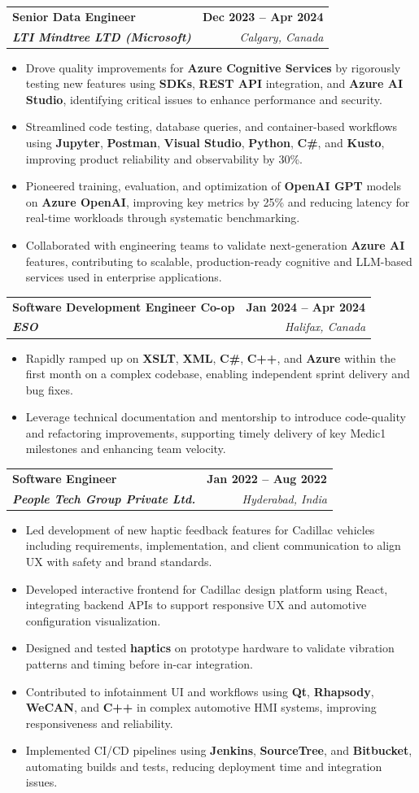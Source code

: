 \documentclass[letterpaper,11pt]{article}
\makeatletter
\newcommand{\resumeItem}[1]{
  \item\small{
    {#1 \vspace{-2pt}}
  }
}
\newcommand{\resumeSubheading}[4]{
  \vspace{-2pt}\item
    \begin{tabular*}{1.0\textwidth}[t]{l@{\extracolsep{\fill}}r}
      \textbf{#1} & \textbf{\small #2} \\
      \textit{\small#3} & \textit{\small #4} \\
    \end{tabular*}\vspace{-7pt}
}
\newcommand{\resumeItemListStart}{\begin{itemize}}
\newcommand{\resumeItemListEnd}{\end{itemize}\vspace{-5pt}}
\makeatother
\begin{document}
    \resumeSubheading
      {\textbf{Senior Data Engineer}}{\textbf{Dec 2023 -- Apr 2024}}
      {\textbf{LTI Mindtree LTD (Microsoft)}}{Calgary, Canada}
      \resumeItemListStart
        \resumeItem{Drove quality improvements for \textbf{Azure Cognitive Services} by rigorously testing new features using \textbf{SDKs}, \textbf{REST API} integration, and \textbf{Azure AI Studio}, identifying critical issues to enhance performance and security.}
        \resumeItem{Streamlined code testing, database queries, and container-based workflows using \textbf{Jupyter}, \textbf{Postman}, \textbf{Visual Studio}, \textbf{Python}, \textbf{C\#}, and \textbf{Kusto}, improving product reliability and observability by 30\%.}
        \resumeItem{Pioneered training, evaluation, and optimization of \textbf{OpenAI GPT} models on \textbf{Azure OpenAI}, improving key metrics by 25\% and reducing latency for real-time workloads through systematic benchmarking.}
        \resumeItem{Collaborated with engineering teams to validate next-generation \textbf{Azure AI} features, contributing to scalable, production-ready cognitive and LLM-based services used in enterprise applications.}
      \resumeItemListEnd
    
    \resumeSubheading
      {\textbf{Software Development Engineer Co-op}}{\textbf{Jan 2024 -- Apr 2024}}
      {\textbf{ESO}}{Halifax, Canada}
      \resumeItemListStart
        \resumeItem{Rapidly ramped up on \textbf{XSLT}, \textbf{XML}, \textbf{C\#}, \textbf{C++}, and \textbf{Azure} within the first month on a complex codebase, enabling independent sprint delivery and bug fixes.}
        \resumeItem{Leverage technical documentation and mentorship to introduce code-quality and refactoring improvements, supporting timely delivery of key Medic1 milestones and enhancing team velocity.}
      \resumeItemListEnd

    \resumeSubheading
      {\textbf{Software Engineer}}{\textbf{Jan 2022 -- Aug 2022}}
      {\textbf{People Tech Group Private Ltd.}}{Hyderabad, India}
      \resumeItemListStart
        \resumeItem{Led development of new haptic feedback features for Cadillac vehicles including requirements, implementation, and client communication to align UX with safety and brand standards.}
        \resumeItem{Developed interactive frontend for Cadillac design platform using React, integrating backend APIs to support responsive UX and automotive configuration visualization.}
        \resumeItem{Designed and tested \textbf{haptics} on prototype hardware to validate vibration patterns and timing before in-car integration.}
        \resumeItem{Contributed to infotainment UI and workflows using \textbf{Qt}, \textbf{Rhapsody}, \textbf{WeCAN}, and \textbf{C++} in complex automotive HMI systems, improving responsiveness and reliability.}
        \resumeItem{Implemented CI/CD pipelines using \textbf{Jenkins}, \textbf{SourceTree}, and \textbf{Bitbucket}, automating builds and tests, reducing deployment time and integration issues.}
      \resumeItemListEnd
\end{document}
